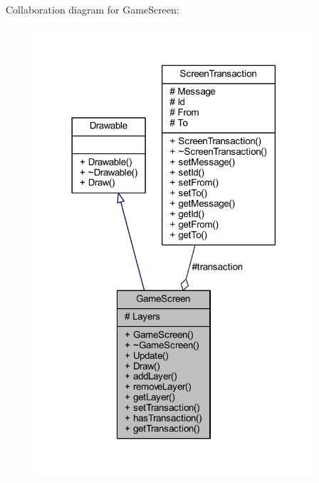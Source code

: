 Collaboration diagram for Game\-Screen\-:\nopagebreak
\begin{figure}[H]
\begin{center}
\leavevmode
\includegraphics[width=294pt]{class_game_screen__coll__graph}
\end{center}
\end{figure}
